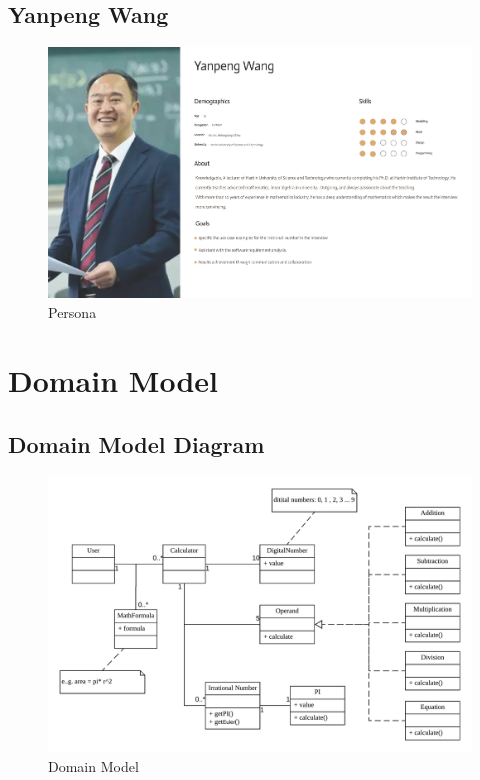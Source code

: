 \documentclass[12pt]{report}
\begin{document}
{\section{Yanpeng Wang}
	\begin{figure}[h!]
		\centering
		\includegraphics[width=\textwidth]{assets/persona.png}
		\caption{Persona}
		\label{fig:universe}
	\end{figure}

\chapter{Domain Model}
\section{Domain Model Diagram}

	\begin{figure}[h!]
		\centering
		\includegraphics[width=\textwidth]{assets/Domain_Model.png}
		\caption{Domain Model}
		\label{fig:universe}
	\end{figure}
	
}
\end{document}

